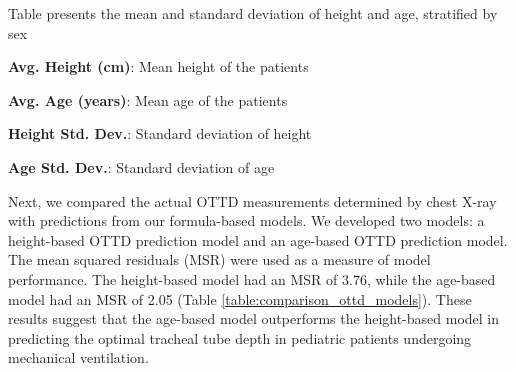 \documentclass[11pt]{article}
\begin{document}
\begin{table}[h]
\caption{Descriptive statistics of height and age stratified by sex}
\label{table:descriptive_statistics}
\begin{threeparttable}
\renewcommand{\TPTminimum}{\linewidth}
\begin{tablenotes}
\footnotesize
\item Table presents the mean and standard deviation of height and age, stratified by sex
\item \textbf{Avg. Height (cm)}: Mean height of the patients
\item \textbf{Avg. Age (years)}: Mean age of the patients
\item \textbf{Height Std. Dev.}: Standard deviation of height
\item \textbf{Age Std. Dev.}: Standard deviation of age
\end{tablenotes}
\end{threeparttable}
\end{table}


Next, we compared the actual OTTD measurements determined by chest X-ray with predictions from our formula-based models. We developed two models: a height-based OTTD prediction model and an age-based OTTD prediction model. The mean squared residuals (MSR) were used as a measure of model performance. The height-based model had an MSR of 3.76, while the age-based model had an MSR of 2.05 (Table \ref{table:comparison_ottd_models}). These results suggest that the age-based model outperforms the height-based model in predicting the optimal tracheal tube depth in pediatric patients undergoing mechanical ventilation.
\end{document}

